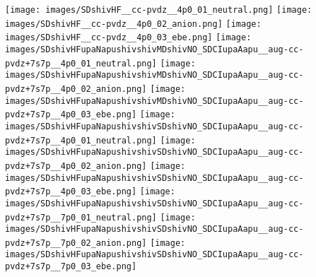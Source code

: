 \texttt{[image: images/SDshivHF\_\_cc-pvdz\_\_4p0\_01\_neutral.png]}
\texttt{[image: images/SDshivHF\_\_cc-pvdz\_\_4p0\_02\_anion.png]}
\texttt{[image: images/SDshivHF\_\_cc-pvdz\_\_4p0\_03\_ebe.png]}
\texttt{[image: images/SDshivHFupaNapushivshivMDshivNO\_SDCIupaAapu\_\_aug-cc-pvdz+7s7p\_\_4p0\_01\_neutral.png]}
\texttt{[image: images/SDshivHFupaNapushivshivMDshivNO\_SDCIupaAapu\_\_aug-cc-pvdz+7s7p\_\_4p0\_02\_anion.png]}
\texttt{[image: images/SDshivHFupaNapushivshivMDshivNO\_SDCIupaAapu\_\_aug-cc-pvdz+7s7p\_\_4p0\_03\_ebe.png]}
\texttt{[image: images/SDshivHFupaNapushivshivSDshivNO\_SDCIupaAapu\_\_aug-cc-pvdz+7s7p\_\_4p0\_01\_neutral.png]}
\texttt{[image: images/SDshivHFupaNapushivshivSDshivNO\_SDCIupaAapu\_\_aug-cc-pvdz+7s7p\_\_4p0\_02\_anion.png]}
\texttt{[image: images/SDshivHFupaNapushivshivSDshivNO\_SDCIupaAapu\_\_aug-cc-pvdz+7s7p\_\_4p0\_03\_ebe.png]}
\texttt{[image: images/SDshivHFupaNapushivshivSDshivNO\_SDCIupaAapu\_\_aug-cc-pvdz+7s7p\_\_7p0\_01\_neutral.png]}
\texttt{[image: images/SDshivHFupaNapushivshivSDshivNO\_SDCIupaAapu\_\_aug-cc-pvdz+7s7p\_\_7p0\_02\_anion.png]}
\texttt{[image: images/SDshivHFupaNapushivshivSDshivNO\_SDCIupaAapu\_\_aug-cc-pvdz+7s7p\_\_7p0\_03\_ebe.png]}

